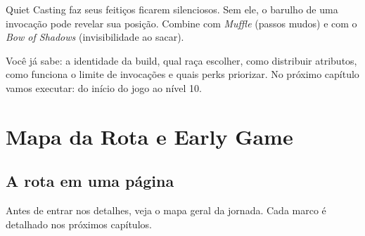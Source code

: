 \documentclass[11pt,a4paper,oneside,openany]{book}
\newcommand{\magia}[1]{\textit{\textcolor{SoulCairnPurple}{#1}}}
\newcommand{\objeto}[1]{\textit{\textcolor{NecroEmerald}{#1}}}
\newcommand{\perk}[1]{\textsf{\textcolor{SoulCairnPurple}{#1}}}
\begin{document}
\begin{dica}
\perk{Quiet Casting} faz seus feitiços ficarem silenciosos. Sem ele, o barulho de uma invocação pode revelar sua posição. Combine com \magia{Muffle} (passos mudos) e com o \objeto{Bow of Shadows} (invisibilidade ao sacar).
\end{dica}

\begin{checkpoint}
Você já sabe: a identidade da build, qual raça escolher, como distribuir atributos, como funciona o limite de invocações e quais perks priorizar. No próximo capítulo vamos executar: do início do jogo ao nível 10.
\end{checkpoint}

\chapter{Mapa da Rota e Early Game}

\section{A rota em uma página}
Antes de entrar nos detalhes, veja o mapa geral da jornada. Cada marco é detalhado nos próximos capítulos.
\end{document}
